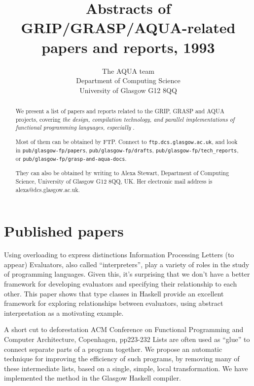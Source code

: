 



\title{Abstracts of GRIP/GRASP/AQUA-related papers and reports, 1993
}

\author{The AQUA team \\ Department of Computing Science \\
University of Glasgow G12 8QQ
}

\maketitle

\begin{abstract}
We present a list of papers and reports related to the GRIP, GRASP and AQUA projects,
covering {\em the design, compilation technology,
and parallel implementations of functional programming languages, especially
\Haskell{}}.

Most of them can be obtained by FTP.  Connect to {\tt ftp.dcs.glasgow.ac.uk},
and look in {\tt pub/glasgow-fp/papers}, {\tt pub/glasgow-fp/drafts}, {\tt pub/glasgow-fp/tech\_reports},
or {\tt pub/glasgow-fp/grasp-and-aqua-docs}.

They can also be obtained by writing to 
Alexa Stewart, Department of Computing Science,
University of Glasgow G12 8QQ, UK.   Her electronic mail address is
alexa@dcs.glasgow.ac.uk.
\end{abstract}

\section{Published papers}

{Using overloading to express distinctions}
{Information Processing Letters (to appear)}
{
Evaluators, also called ``interpreters'', play a variety of roles
in the study of programming languages.  Given this, it's surprising
that we don't have a better framework for developing evaluators and
specifying their relationship to each other. This paper
shows that type classes in Haskell provide an excellent 
framework for exploring relationships between evaluators, using
abstract interpretation as a motivating example.
}

{A short cut to deforestation}
{ACM Conference on Functional Programming and Computer Architecture, Copenhagen, pp223-232}
{Lists are often used as ``glue'' to connect
separate parts of a program together.
We propose an automatic technique for 
improving the efficiency of such programs,
by removing many of these intermediate lists,
based on a single, simple, local transformation.
We have implemented the method in the Glasgow Haskell compiler.
}

